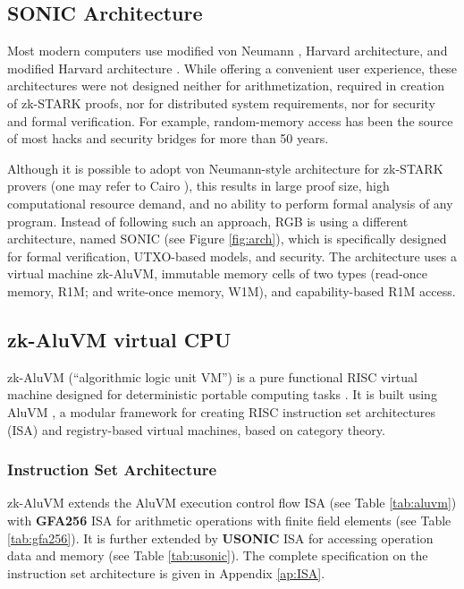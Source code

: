 \documentclass[9pt,oneside]{amsart}
\begin{document}
\begin{multicols}{2}

\section{SONIC Architecture}\label{Sonic}

Most modern computers use modified von Neumann \cite{vonNeumann},
Harvard architecture, and modified Harvard architecture \cite{Harvard}.
While offering a convenient user experience, these architectures were not designed neither for
arithmetization, required in creation of zk-STARK proofs, nor for distributed system requirements,
nor for security and formal verification.
For example, random-memory access has been the source
of most hacks and security bridges for more than 50 years.

Although it is possible to adopt von Neumann-style architecture for zk-STARK provers
(one may refer to Cairo \cite{Cairo}), this results in large proof size,
high computational resource demand, and no ability to perform formal analysis of any program.
Instead of following such an approach, RGB is using a different architecture,
named SONIC (see Figure \ref{fig:arch}),
which is specifically designed for formal verification, UTXO-based models, and security.
The architecture uses a virtual machine zk-AluVM, immutable memory cells of two types
(read-once memory, R1M; and write-once memory, W1M), and capability-based R1M access.

\subsection{zk-AluVM virtual CPU}\label{AluVM}

zk-AluVM (``algorithmic logic unit VM'') is a pure functional RISC virtual machine
designed for deterministic portable computing tasks \cite{zkAluVM}.
It is built using AluVM \cite{AluVM, AluVMCrate},
a modular framework for creating RISC instruction set architectures (ISA)
and registry-based virtual machines, based on category theory.

\subsubsection{Instruction Set Architecture}

zk-AluVM extends the AluVM execution control flow ISA (see Table \ref{tab:aluvm})
with \textbf{GFA256} ISA for arithmetic operations
with finite field elements (see Table \ref{tab:gfa256}).
It is further extended by \textbf{USONIC} ISA
for accessing operation data and memory (see Table \ref{tab:usonic}).
The complete specification on the instruction set architecture is given in Appendix \ref{ap:ISA}.


\end{multicols}
\end{document}
